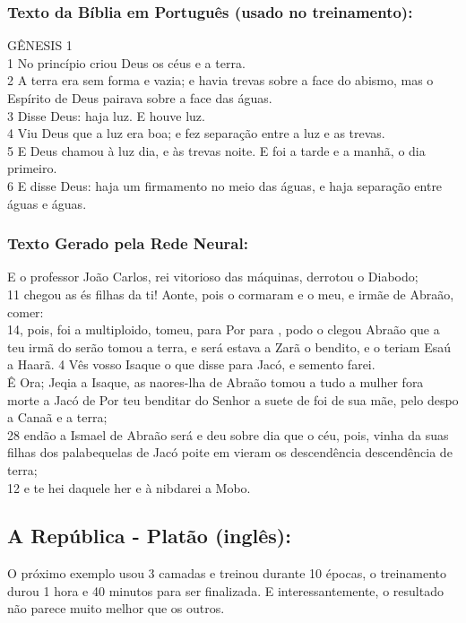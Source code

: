 \documentclass[a4paper,12pt]{article}
\begin{document}
\subsubsection*{\textbf{Texto da Bíblia em Português (usado no treinamento):}}
{
    GÊNESIS 1\\1 No princípio criou Deus os céus e a terra.\\
    2 A terra era sem forma e vazia; e havia trevas sobre a face do abismo, mas o Espírito de Deus pairava sobre a face das águas.\\
    3 Disse Deus: haja luz. E houve luz.\\
    4 Viu Deus que a luz era boa; e fez separação entre a luz e as trevas.\\
    5 E Deus chamou à luz dia, e às trevas noite. E foi a tarde e a manhã, o dia primeiro.\\ 
    6 E disse Deus: haja um firmamento no meio das águas, e haja separação entre águas e águas.
}

\subsubsection*{\textbf{Texto Gerado pela Rede Neural}:}
E o professor João Carlos, rei vitorioso das máquinas, derrotou o Diabodo;\\
11 chegou as és filhas da ti! Aonte, pois o cormaram e o meu, e irmãe de Abraão, comer:\\
14, pois, foi a multiploido, tomeu, para Por para , podo o clegou Abraão que a teu irmã do serão tomou a terra, e será estava a Zarã o bendito, e o teriam Esaú a Haarã.
4 Vês vosso Isaque o que disse para Jacó, e semento farei.\\
Ê Ora; Jeqia a Isaque, as naores-lha de Abraão tomou a tudo a mulher fora morte a Jacó de Por teu benditar do Senhor a suete de foi de sua mãe, pelo despo a Canaã e a terra;\\
28 endão a Ismael de Abraão será  e deu sobre dia que o céu, pois, vinha da suas filhas dos palabequelas de Jacó poite em vieram os descendência descendência de terra;\\
12 e te hei daquele her e à nibdarei a Mobo.

\subsection{\textbf{A República - Platão (inglês):}}
O próximo exemplo usou 3 camadas e treinou durante 10 épocas, o treinamento durou 1 hora e 40 minutos para ser finalizada. E interessantemente,
o resultado não parece muito melhor que os outros.
\end{document}
